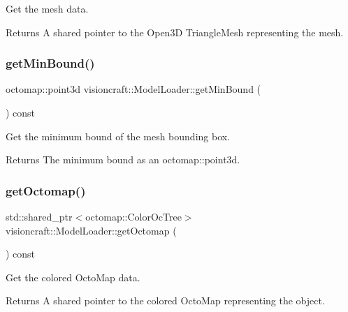 Get the mesh data. 

\begin{DoxyReturn}{Returns}
A shared pointer to the Open3D Triangle\+Mesh representing the mesh. 
\end{DoxyReturn}
\mbox{\label{classvisioncraft_1_1ModelLoader_a3edc3582762a0d32e4d47264db00f65a}} 
\subsubsection{\texorpdfstring{get\+Min\+Bound()}{getMinBound()}}
{\footnotesize\ttfamily octomap\+::point3d visioncraft\+::\+Model\+Loader\+::get\+Min\+Bound (\begin{DoxyParamCaption}{ }\end{DoxyParamCaption}) const\hspace{0.3cm}{\ttfamily [inline]}}



Get the minimum bound of the mesh bounding box. 

\begin{DoxyReturn}{Returns}
The minimum bound as an octomap\+::point3d. 
\end{DoxyReturn}
\mbox{\label{classvisioncraft_1_1ModelLoader_ab4958a63b88acb8734245e5b1a1c13dc}} 
\subsubsection{\texorpdfstring{get\+Octomap()}{getOctomap()}}
{\footnotesize\ttfamily std\+::shared\+\_\+ptr$<$octomap\+::\+Color\+Oc\+Tree$>$ visioncraft\+::\+Model\+Loader\+::get\+Octomap (\begin{DoxyParamCaption}{ }\end{DoxyParamCaption}) const\hspace{0.3cm}{\ttfamily [inline]}}



Get the colored Octo\+Map data. 

\begin{DoxyReturn}{Returns}
A shared pointer to the colored Octo\+Map representing the object. 
\end{DoxyReturn}
\mbox{\label{classvisioncraft_1_1ModelLoader_a3de1482844c50ad81dfa4b979913267c}} 
